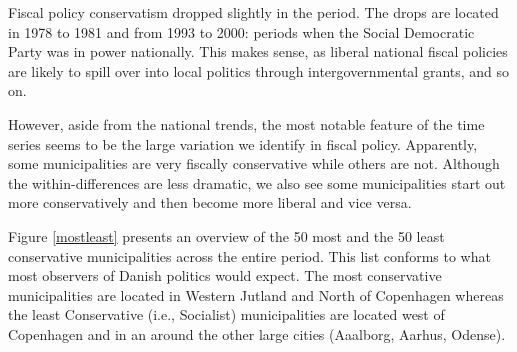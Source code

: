 \documentclass[a4paper,12pt]{article}
\begin{document}
Fiscal policy conservatism dropped slightly in the period. The drops are located in 1978 to 1981 and from 1993 to 2000: periods when the Social Democratic Party was in power nationally. This makes sense, as liberal national fiscal policies are likely to spill over into local politics through intergovernmental grants, and so on.

However, aside from the national trends, the most notable feature of the time series seems to be the large variation we identify in fiscal policy. Apparently, some municipalities are very fiscally conservative while others are not. Although the within-differences are less dramatic, we also see some municipalities start out more conservatively and then become more liberal and vice versa.

Figure \ref{mostleast} presents an overview of the 50 most and the 50 least conservative municipalities across the entire period. This list conforms to what most observers of Danish politics would expect. The most conservative municipalities are located in Western Jutland and North of Copenhagen whereas the least Conservative (i.e., Socialist) municipalities are located west of Copenhagen and in an around the other large cities (Aaalborg, Aarhus, Odense). 
\end{document}
